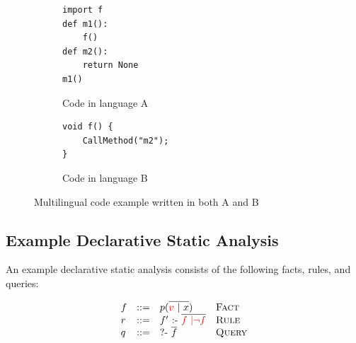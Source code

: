 \begin{figure}[t]
  \centering
  \begin{subfigure}[t]{0.3\textwidth}
    \begin{lstlisting}[style=mpython]
import f
def m1():
    f()
def m2():
    return None
m1()
    \end{lstlisting}
    \vspace*{-.5em}
    \caption{\normalsize Code in language A}
    \label{fig:exam:langA}
  \end{subfigure}
  \begin{subfigure}[t]{0.3\textwidth}
    \begin{lstlisting}[style=mcpp,firstnumber=7]
void f() {
    CallMethod("m2");
}
    \end{lstlisting}
    \vspace*{3.5em}
    \caption{\normalsize Code in language B}
    \label{fig:exam:langB}
  \end{subfigure}
  \vspace*{-.5em}
  \caption{Multilingual code example written in both A and B}
  \label{fig:exam}
\end{figure}

%

\subsection{Example Declarative Static Analysis}
An example declarative static analysis consists of the following  facts, rules, and queries:

\[
  \begin{array}{llll}
    f & ::= & p(\overline{{\color{red}{v}}\ |\ x}) & \text{\sc Fact}\\
    r & ::= & f'\ \mbox{:-}\ \overline{{\color{red}{f\ |\neg f}}} & \text{\sc Rule}\\
    q & ::= & \mbox{?-}\ \overline{f}\ &  \text{\sc Query}
\end{array}
\]

